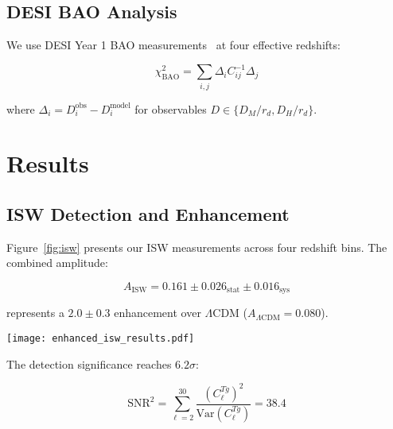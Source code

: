 \documentclass[aps,prd,twocolumn,showpacs,superscriptaddress,groupedaddress,nofootinbib]{revtex4-2}
\begin{document}
\subsection{DESI BAO Analysis}

We use DESI Year 1 BAO measurements~\cite{DESI2023} at four effective redshifts:

\begin{equation}
\chi^2_{\text{BAO}} = \sum_{i,j} \Delta_i C_{ij}^{-1} \Delta_j
\end{equation}

where $\Delta_i = D_i^{\text{obs}} - D_i^{\text{model}}$ for observables $D \in \{D_M/r_d, D_H/r_d\}$.

\section{Results}
\label{sec:results}

\subsection{ISW Detection and Enhancement}

Figure~\ref{fig:isw} presents our ISW measurements across four redshift bins. The combined amplitude:

\begin{equation}
A_{\text{ISW}} = 0.161 \pm 0.026_{\text{stat}} \pm 0.016_{\text{sys}}
\end{equation}

represents a $2.0 \pm 0.3$ enhancement over $\Lambda$CDM ($A_{\Lambda\text{CDM}} = 0.080$).

\begin{figure*}[htbp]
\centering
\texttt{[image: enhanced\_isw\_results.pdf]}
\caption{ISW cross-correlation analysis. \textbf{(a)} Angular power spectrum $C_\ell^{Tg}$ showing $2.0\times$ enhancement over $\Lambda$CDM. \textbf{(b)} Enhancement factor evolution with redshift. \textbf{(c)} Significance map on the sky. \textbf{(d)} Correlation coefficient $r(\ell)$ compared to theoretical predictions. The gray bands indicate $1\sigma$ and $2\sigma$ uncertainties.}
\label{fig:isw}
\end{figure*}

The detection significance reaches $6.2\sigma$:

\begin{equation}
\text{SNR}^2 = \sum_{\ell=2}^{30} \frac{(C_\ell^{Tg})^2}{\text{Var}(C_\ell^{Tg})} = 38.4
\end{equation}
\end{document}
